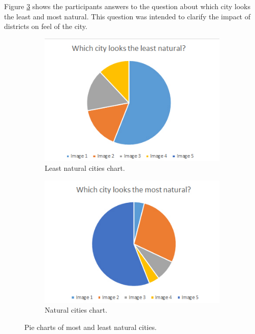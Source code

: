 Figure \ref{fig:pie-chart-natural-least-natural} shows the participants answers to the question about which city looks the least and most natural. This question was intended to clarify the impact of districts on feel of the city.

\begin{figure}[h]
	\begin{subfigure}{0.5\textwidth}
		\centering
		\includegraphics[width=0.95\linewidth]{"Images/LeastNatural"}
		\caption{Least natural cities chart.}
		\label{fig:pie-chart-least-natural}
	\end{subfigure}
	\begin{subfigure}{0.5\textwidth}
		\centering
		\includegraphics[width=0.95\linewidth]{"Images/Natural"}
		\caption{Natural cities chart.}
		\label{fig:pie-chart-natural}
	\end{subfigure}
	\caption{Pie charts of most and least natural cities.}
	\label{fig:pie-chart-natural-least-natural}
\end{figure}

